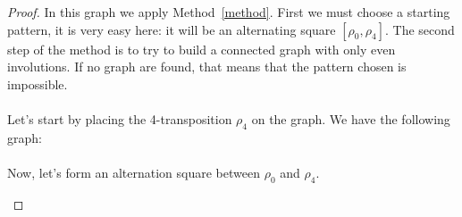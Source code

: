 \begin{proof}
  In this graph we apply Method~\ref{method}. First we must choose a starting pattern, it is very easy here: it will be an alternating square $[\rho_0, \rho_4]$. The second step of the method is to try to build a connected graph with only even involutions. If no graph are found, that means that the pattern chosen is impossible.

  \paragraph{}
  Let's start by placing the 4-transposition $\rho_4$ on the graph. We have the following graph:

  \paragraph{}
  Now, let's form an alternation square between $\rho_0$ and $\rho_4$.

  \begin{figure}[H]
    \begin{center}
      \caption{}
    \end{center}
  \end{figure}


\end{proof}

